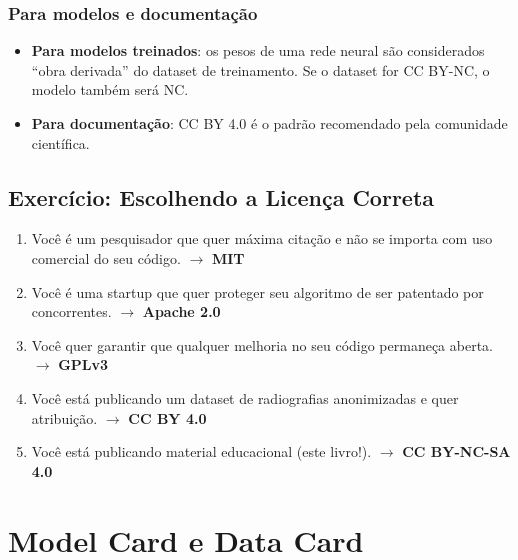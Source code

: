 \subsubsection{Para modelos e documentação}

\begin{itemize}
  \item \textbf{Para modelos treinados}: os pesos de uma rede neural são
    considerados ``obra derivada'' do dataset de treinamento. Se o dataset
    for CC BY-NC, o modelo também será NC.

  \item \textbf{Para documentação}: CC BY 4.0 é o padrão recomendado pela
    comunidade científica.
\end{itemize}


\subsection{Exercício: Escolhendo a Licença Correta}

\begin{enumerate}
  \item Você é um pesquisador que quer máxima citação e não se importa
    com uso comercial do seu código. $\rightarrow$ \textbf{MIT}
  \item Você é uma startup que quer proteger seu algoritmo de ser
    patentado por concorrentes. $\rightarrow$ \textbf{Apache 2.0}
  \item Você quer garantir que qualquer melhoria no seu código permaneça
    aberta. $\rightarrow$ \textbf{GPLv3}
  \item Você está publicando um dataset de radiografias anonimizadas e
    quer atribuição. $\rightarrow$ \textbf{CC BY 4.0}
  \item Você está publicando material educacional (este livro!).
    $\rightarrow$ \textbf{CC BY-NC-SA 4.0}
\end{enumerate}

\section{Model Card e Data Card}

